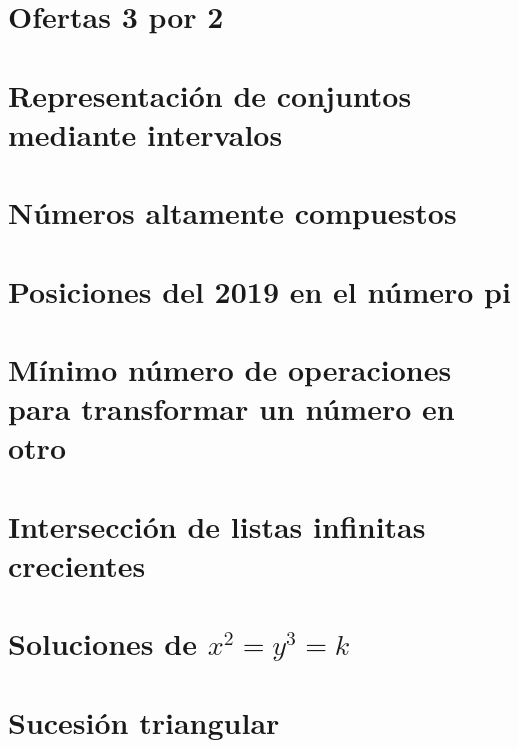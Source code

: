 \documentclass[a4paper,12pt,twoside]{book}
\begin{document}

\chapter{Ofertas 3 por 2}
\label{190114}

\chapter{Representación de conjuntos mediante intervalos}
\label{190115}

\chapter{Números altamente compuestos}
\label{190116}

\chapter{Posiciones del 2019 en el número pi}
\label{190117}

\chapter{Mínimo número de operaciones para transformar
  un número en otro}
\label{190118}


\chapter{Intersección de listas infinitas crecientes}
\label{190121}

\chapter{Soluciones de \(x^2 = y^3 = k\)}
\label{190122}

\chapter{Sucesión triangular}
\label{190123}
\end{document}
